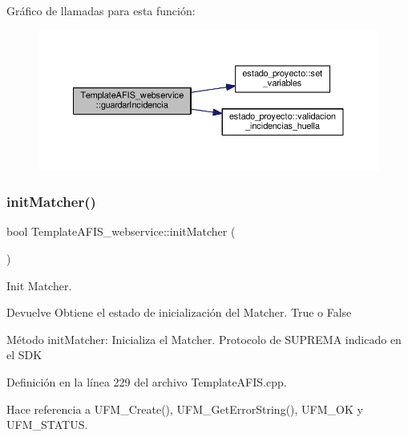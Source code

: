 Gráfico de llamadas para esta función\+:\nopagebreak
\begin{figure}[H]
\begin{center}
\leavevmode
\includegraphics[width=350pt]{classTemplateAFIS__webservice_aa4536bcf883164f6c3c6d9dcb8744c7f_cgraph}
\end{center}
\end{figure}
\hypertarget{classTemplateAFIS__webservice_a8698c0f638f3be26a0664edd56038847}{}\label{classTemplateAFIS__webservice_a8698c0f638f3be26a0664edd56038847} 
\subsubsection{\texorpdfstring{init\+Matcher()}{initMatcher()}}
{\footnotesize\ttfamily bool Template\+A\+F\+I\+S\+\_\+webservice\+::init\+Matcher (\begin{DoxyParamCaption}{ }\end{DoxyParamCaption})}



Init Matcher. 

\begin{DoxyReturn}{Devuelve}
Obtiene el estado de inicialización del Matcher. True o False
\end{DoxyReturn}
Método init\+Matcher\+: Inicializa el Matcher. Protocolo de S\+U\+P\+R\+E\+MA indicado en el S\+DK 

Definición en la línea 229 del archivo Template\+A\+F\+I\+S.\+cpp.



Hace referencia a U\+F\+M\+\_\+\+Create(), U\+F\+M\+\_\+\+Get\+Error\+String(), U\+F\+M\+\_\+\+OK y U\+F\+M\+\_\+\+S\+T\+A\+T\+US.

